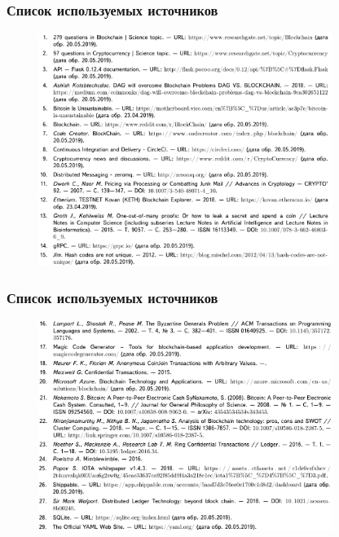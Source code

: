 \documentclass{beamer}
\begin{document}
\begin{frame}
    \frametitle{Список используемых источников}
    \begin{figure}
        \centering
        \includegraphics[width=0.85\textwidth]{lib1}
    \end{figure}
\end{frame}

\begin{frame}
    \frametitle{Список используемых источников}
    \begin{figure}
        \centering
        \includegraphics[width=0.85\textwidth]{lib2}
    \end{figure}
\end{frame}
\end{document}

